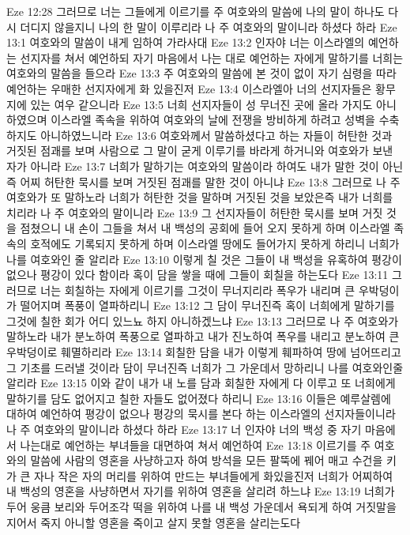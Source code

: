 Eze 12:28  그러므로 너는 그들에게 이르기를 주 여호와의 말씀에 나의 말이 하나도 다시 더디지 않을지니 나의 한 말이 이루리라 나 주 여호와의 말이니라 하셨다 하라
Eze 13:1  여호와의 말씀이 내게 임하여 가라사대
Eze 13:2  인자야 너는 이스라엘의 예언하는 선지자를 쳐서 예언하되 자기 마음에서 나는 대로 예언하는 자에게 말하기를 너희는 여호와의 말씀을 들으라
Eze 13:3  주 여호와의 말씀에 본 것이 없이 자기 심령을 따라 예언하는 우매한 선지자에게 화 있을진저
Eze 13:4  이스라엘아 너의 선지자들은 황무지에 있는 여우 같으니라
Eze 13:5  너희 선지자들이 성 무너진 곳에 올라 가지도 아니하였으며 이스라엘 족속을 위하여 여호와의 날에 전쟁을 방비하게 하려고 성벽을 수축하지도 아니하였느니라
Eze 13:6  여호와께서 말씀하셨다고 하는 자들이 허탄한 것과 거짓된 점괘를 보며 사람으로 그 말이 굳게 이루기를 바라게 하거니와 여호와가 보낸 자가 아니라
Eze 13:7  너희가 말하기는 여호와의 말씀이라 하여도 내가 말한 것이 아닌즉 어찌 허탄한 묵시를 보며 거짓된 점괘를 말한 것이 아니냐
Eze 13:8  그러므로 나 주 여호와가 또 말하노라 너희가 허탄한 것을 말하며 거짓된 것을 보았은즉 내가 너희를 치리라 나 주 여호와의 말이니라
Eze 13:9  그 선지자들이 허탄한 묵시를 보며 거짓 것을 점쳤으니 내 손이 그들을 쳐서 내 백성의 공회에 들어 오지 못하게 하며 이스라엘 족속의 호적에도 기록되지 못하게 하며 이스라엘 땅에도 들어가지 못하게 하리니 너희가 나를 여호와인 줄 알리라
Eze 13:10  이렇게 칠 것은 그들이 내 백성을 유혹하여 평강이 없으나 평강이 있다 함이라 혹이 담을 쌓을 때에 그들이 회칠을 하는도다
Eze 13:11  그러므로 너는 회칠하는 자에게 이르기를 그것이 무너지리라 폭우가 내리며 큰 우박덩이가 떨어지며 폭풍이 열파하리니
Eze 13:12  그 담이 무너진즉 혹이 너희에게 말하기를 그것에 칠한 회가 어디 있느뇨 하지 아니하겠느냐
Eze 13:13  그러므로 나 주 여호와가 말하노라 내가 분노하여 폭풍으로 열파하고 내가 진노하여 폭우를 내리고 분노하여 큰 우박덩이로 훼멸하리라
Eze 13:14  회칠한 담을 내가 이렇게 훼파하여 땅에 넘어뜨리고 그 기초를 드러낼 것이라 담이 무너진즉 너희가 그 가운데서 망하리니 나를 여호와인줄 알리라
Eze 13:15  이와 같이 내가 내 노를 담과 회칠한 자에게 다 이루고 또 너희에게 말하기를 담도 없어지고 칠한 자들도 없어졌다 하리니
Eze 13:16  이들은 예루살렘에 대하여 예언하여 평강이 없으나 평강의 묵시를 본다 하는 이스라엘의 선지자들이니라 나 주 여호와의 말이니라 하셨다 하라
Eze 13:17  너 인자야 너의 백성 중 자기 마음에서 나는대로 예언하는 부녀들을 대면하여 쳐서 예언하여
Eze 13:18  이르기를 주 여호와의 말씀에 사람의 영혼을 사냥하고자 하여 방석을 모든 팔뚝에 꿰어 매고 수건을 키가 큰 자나 작은 자의 머리를 위하여 만드는 부녀들에게 화있을진저 너희가 어찌하여 내 백성의 영혼을 사냥하면서 자기를 위하여 영혼을 살리려 하느냐
Eze 13:19  너희가 두어 웅큼 보리와 두어조각 떡을 위하여 나를 내 백성 가운데서 욕되게 하여 거짓말을 지어서 죽지 아니할 영혼을 죽이고 살지 못할 영혼을 살리는도다
